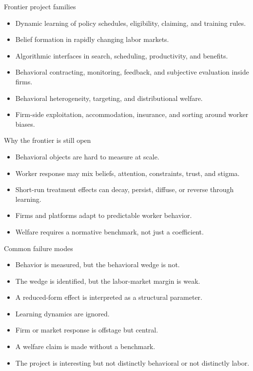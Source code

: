 \documentclass[aspectratio=169,11pt]{beamer}
\begin{document}
\begin{frame}{Frontier project families}
\begin{itemize}
    \item Dynamic learning of policy schedules, eligibility, claiming, and training rules.
    \item Belief formation in rapidly changing labor markets.
    \item Algorithmic interfaces in search, scheduling, productivity, and benefits.
    \item Behavioral contracting, monitoring, feedback, and subjective evaluation inside firms.
    \item Behavioral heterogeneity, targeting, and distributional welfare.
    \item Firm-side exploitation, accommodation, insurance, and sorting around worker biases.
\end{itemize}
\end{frame}

\begin{frame}{Why the frontier is still open}
\begin{itemize}
    \item Behavioral objects are hard to measure at scale.
    \item Worker response may mix beliefs, attention, constraints, trust, and stigma.
    \item Short-run treatment effects can decay, persist, diffuse, or reverse through learning.
    \item Firms and platforms adapt to predictable worker behavior.
    \item Welfare requires a normative benchmark, not just a coefficient.
\end{itemize}
\end{frame}

\begin{frame}{Common failure modes}
\begin{itemize}
    \item Behavior is measured, but the behavioral wedge is not.
    \item The wedge is identified, but the labor-market margin is weak.
    \item A reduced-form effect is interpreted as a structural parameter.
    \item Learning dynamics are ignored.
    \item Firm or market response is offstage but central.
    \item A welfare claim is made without a benchmark.
    \item The project is interesting but not distinctly behavioral or not distinctly labor.
\end{itemize}
\end{frame}
\end{document}
